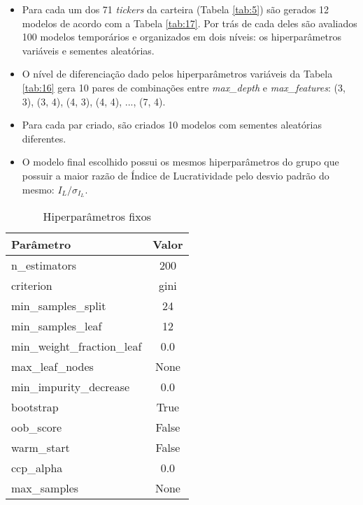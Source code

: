 \begin{itemize}
    \item Para cada um dos 71 \textit{tickers} da carteira (Tabela \ref{tab:5}) são gerados 12 modelos de acordo com a Tabela \ref{tab:17}. Por trás de cada deles são avaliados 100 modelos temporários e organizados em dois níveis: os hiperparâmetros variáveis e sementes aleatórias.

    \item O nível de diferenciação dado pelos hiperparâmetros variáveis da Tabela \ref{tab:16} gera 10 pares de combinações entre \textit{max\_depth} e \textit{max\_features}: (3, 3), (3, 4), (4, 3), (4, 4), ..., (7, 4).

    \item Para cada par criado, são criados 10 modelos com sementes aleatórias diferentes.

    \item O modelo final escolhido possui os mesmos hiperparâmetros do grupo que possuir a maior razão de Índice de Lucratividade pelo desvio padrão do mesmo: \begin{math} I_L / \sigma_{I_L} \end{math}.
\end{itemize}

\begin{table}[!htb]
    \begin{center}
        \begin{tabular}{ l|c }
            Parâmetro & Valor \\
            \hline
            n\_estimators & 200 \\
            criterion & gini \\
            min\_samples\_split & 24 \\
            min\_samples\_leaf & 12 \\
            min\_weight\_fraction\_leaf & 0.0 \\
            max\_leaf\_nodes & None \\
            min\_impurity\_decrease & 0.0 \\
            bootstrap & True \\
            oob\_score & False \\
            warm\_start & False \\
            ccp\_alpha & 0.0 \\
            max\_samples & None \\
        \end{tabular}
        \caption{Hiperparâmetros fixos}
        \label{tab:15}
    \end{center}
\end{table}

